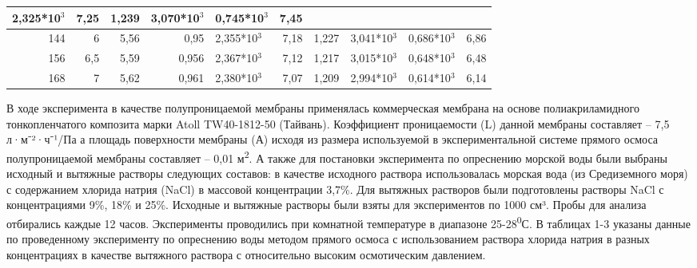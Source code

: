 \begin{table}[H]
{\begin{tabular}{|rr|rrl|rrl|l|r|}
  2,325*10$^3$ &
  \multicolumn{1}{r|}{7,25} &
  \multicolumn{1}{r|}{1,239} &
  3,070*10$^3$ &
  0,745*10$^3$ &
  7,45 \\ \hline
\multicolumn{1}{|r|}{144} &
  6 &
  \multicolumn{1}{r|}{5,56} &
  \multicolumn{1}{r|}{0,95} &
  2,355*10$^3$ &
  \multicolumn{1}{r|}{7,18} &
  \multicolumn{1}{r|}{1,227} &
  3,041*10$^3$ &
  0,686*10$^3$ &
  6,86 \\ \hline
\multicolumn{1}{|r|}{156} &
  6,5 &
  \multicolumn{1}{r|}{5,59} &
  \multicolumn{1}{r|}{0,956} &
  2,367*10$^3$ &
  \multicolumn{1}{r|}{7,12} &
  \multicolumn{1}{r|}{1,217} &
  3,015*10$^3$ &
  0,648*10$^3$ &
  6,48 \\ \hline
\multicolumn{1}{|r|}{168} &
  7 &
  \multicolumn{1}{r|}{5,62} &
  \multicolumn{1}{r|}{0,961} &
  2,380*10$^3$ &
  \multicolumn{1}{r|}{7,07} &
  \multicolumn{1}{r|}{1,209} &
  2,994*10$^3$ &
  0,614*10$^3$ &
  6,14 \\ \hline
\end{tabular}}
\end{table}

\begin{multicols}{2}
В ходе эксперимента в качестве полупроницаемой мембраны применялась
коммерческая мембрана на основе полиакриламидного тонкопленчатого
композита марки Atoll TW40-1812-50 (Тайвань). Коэффициент проницаемости
(L) данной мембраны составляет -- 7,5 л·м⁻²·ч⁻¹/Па а площадь поверхности
мембраны (А) исходя из размера используемой в экспериментальной системе
прямого осмоса полупроницаемой мембраны составляет -- 0,01
м\textsuperscript{2}. А также для постановки эксперимента по опреснению
морской воды были выбраны исходный и вытяжные растворы следующих
составов: в качестве исходного раствора использовалась морская вода (из
Средиземного моря) с содержанием хлорида натрия (NaCl) в массовой
концентрации 3,7\%. Для вытяжных растворов были подготовлены растворы
NaCl с концентрациями 9\%, 18\% и 25\%. Исходные и вытяжные растворы
были взяты для экспериментов по 1000 см³. Пробы для анализа отбирались
каждые 12 часов. Эксперименты проводились при комнатной температуре в
диапазоне 25-28\textsuperscript{0}С. В таблицах 1-3 указаны данные по
проведенному эксперименту по опреснению воды методом прямого осмоса с
использованием раствора хлорида натрия в разных концентрациях в качестве
вытяжного раствора с относительно высоким осмотическим давлением.
\end{multicols}

